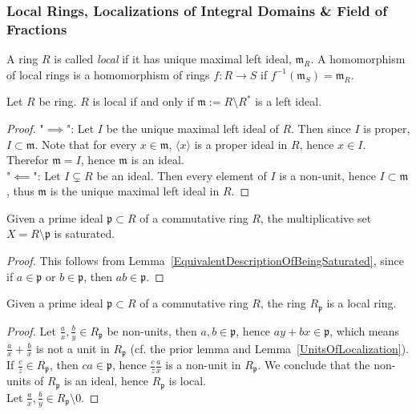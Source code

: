 \subsubsection{Local Rings, Localizations of Integral Domains \& Field of Fractions}
\begin{definition}\label{LocalRingDefinition}
    A ring $R$ is called \textit{local} if it has unique maximal left ideal, $\mathfrak{m}_R$. A homomorphism of local rings is a homomorphism of rings $f : R\rightarrow S$ if $f^{-1}(\mathfrak{m}_S)=\mathfrak{m}_R$. 
\end{definition}
\begin{proposition}\label{EquivalentFormulationOfRingBeingLocal}
    Let $R$ be ring. $R$ is local if and only if $\mathfrak{m}:=R\setminus R^\ast$ is a left ideal.
\end{proposition}
\begin{proof}
    "$\implies$": Let $I$ be the unique maximal left ideal of $R$. Then since $I$ is proper, $I\subset \mathfrak{m}$. Note that for every $x\in \mathfrak{m}$, $\langle x\rangle$ is a proper ideal in $R$, hence $x\in I$. Therefor $\mathfrak{m} = I$, hence $\mathfrak{m}$ is an ideal.\\
    "$\impliedby$": Let $I\subsetneq R$ be an ideal. Then every element of $I$ is a non-unit, hence $I\subset \mathfrak{m}$, thus $\mathfrak{m}$ is the unique maximal left ideal in $R$.
\end{proof}
\begin{lemma}
    Given a prime ideal $\mathfrak{p}\subset R$ of a commutative ring $R$, the multiplicative set $X=R\setminus \mathfrak{p}$ is saturated.
\end{lemma}
\begin{proof}
    This follows from Lemma~\ref{EquivalentDescriptionOfBeingSaturated}, since if $a\in \mathfrak{p}$ or $b\in \mathfrak{p}$, then $ab\in \mathfrak{p}$.  
\end{proof}
\begin{lemma}
    Given a prime ideal $\mathfrak{p}\subset R$ of a commutative ring $R$, the ring $R_\mathfrak{p}$ is a local ring. 
\end{lemma}
\begin{proof}
    Let $\frac{a}{x},\frac{b}{y}\in R_\mathfrak{p}$ be non-units, then $a,b\in \mathfrak{p}$, hence $ay+bx\in \mathfrak{p}$, which means $\frac{a}{x}+\frac{b}{x}$ is not a unit in $R_\mathfrak{p}$ (cf. the prior lemma and Lemma~\ref{UnitsOfLocalization}). If $\frac{c}{z}\in R_\mathfrak{p}$, then $ca\in \mathfrak{p}$, hence $\frac{c}{z}\frac{a}{x}$ is a non-unit in $R_\mathfrak{p}$. We conclude that the non-units of $R_\mathfrak{p}$ is an ideal, hence $R_\mathfrak{p}$ is local.\\
    Let $\frac{a}{x},\frac{b}{y}\in R_\mathfrak{p}\setminus 0$.     
\end{proof}
